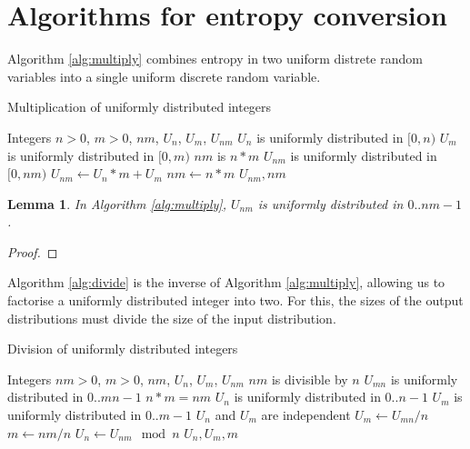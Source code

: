\documentclass[12pt]{article}
\newtheorem{lemma}{Lemma}
\begin{document}
\section{Algorithms for entropy conversion}

Algorithm \ref{alg:multiply} combines entropy in two uniform distrete random variables into a single uniform discrete random variable.

\begin{algorithm}
\caption{Multiplication of uniformly distributed integers}
\label{alg:multiply}
\begin{algorithmic}[1]
    \Require Integers $n>0$, $m>0$, $nm$, $U_n$, $U_m$, $U_{nm}$
    \Require $U_n$ is uniformly distributed in $[0,n)$
    \Require $U_m$ is uniformly distributed in $[0,m)$
\Ensure $nm$ is $n * m$
\Ensure $U_{nm}$ is uniformly distributed in $[0,nm)$
  \State $U_{nm} \gets U_n * m + U_m$
  \State $nm \gets n * m$
  \State \Return $U_{nm}, nm$
\EndProcedure
\end{algorithmic}
\end{algorithm}

\begin{lemma}
In Algorithm \ref{alg:multiply}, $U_{nm}$ is uniformly distributed in $0..nm-1$.
\end{lemma}

\begin{proof}
\end{proof}

Algorithm \ref{alg:divide} is the inverse of Algorithm \ref{alg:multiply}, allowing us to factorise a uniformly distributed integer into two. For this, the sizes of the output distributions must divide the size of the input distribution.

\begin{algorithm}
\caption{Division of uniformly distributed integers}
\label{alg:divide}
\begin{algorithmic}[1]
    \Require Integers $nm>0$, $m>0$, $nm$, $U_n$, $U_m$, $U_{nm}$
    \Require $nm$ is divisible by $n$
    \Require $U_{mn}$ is uniformly distributed in $0..mn-1$
\Ensure $n * m = nm$
\Ensure $U_{n}$ is uniformly distributed in $0..n-1$
\Ensure $U_{m}$ is uniformly distributed in $0..m-1$
\Ensure $U_n$ and $U_m$ are independent
  \State $U_m \gets U_{mn} / n$
  \State $m \gets nm / n$
  \State $U_{n} \gets U_{nm} \mod n$
  \State \Return $U_n, U_m, m$
\EndProcedure
\end{algorithmic}
\end{algorithm}
\end{document}
